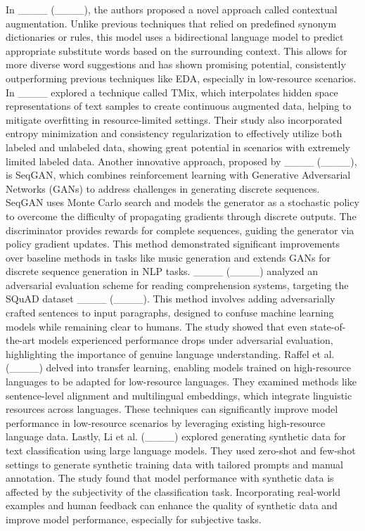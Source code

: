 In ____ (____), the authors proposed a novel approach called contextual augmentation. Unlike previous techniques that relied on predefined synonym dictionaries or rules, this model uses a bidirectional language model to predict appropriate substitute words based on the surrounding context. This allows for more diverse word suggestions and has shown promising potential, consistently outperforming previous techniques like EDA, especially in low-resource scenarios. In
____ explored a technique called TMix, which interpolates hidden space representations of text samples to create continuous augmented data, helping to mitigate overfitting in resource-limited settings. Their study also incorporated entropy minimization and consistency regularization to effectively utilize both labeled and unlabeled data, showing great potential in scenarios with extremely limited labeled data.
Another innovative approach, proposed by ____ (____), is SeqGAN, which combines reinforcement learning with Generative Adversarial Networks (GANs) to address challenges in generating discrete sequences. SeqGAN uses Monte Carlo search and models the generator as a stochastic policy to overcome the difficulty of propagating gradients through discrete outputs. The discriminator provides rewards for complete sequences, guiding the generator via policy gradient updates. This method demonstrated significant improvements over baseline methods in tasks like music generation and extends GANs for discrete sequence generation in NLP tasks. ____ (____) analyzed an adversarial evaluation scheme for reading comprehension systems, targeting the SQuAD dataset ____ (____). This method involves adding adversarially crafted sentences to input paragraphs, designed to confuse machine learning models while remaining clear to humans. The study showed that even state-of-the-art models experienced performance drops under adversarial evaluation, highlighting the importance of genuine language understanding.
Raffel et al. (____) delved into transfer learning, enabling models trained on high-resource languages to be adapted for low-resource languages. They examined methods like sentence-level alignment and multilingual embeddings, which integrate linguistic resources across languages. These techniques can significantly improve model performance in low-resource scenarios by leveraging existing high-resource language data.
Lastly, Li et al. (____) explored generating synthetic data for text classification using large language models. They used zero-shot and few-shot settings to generate synthetic training data with tailored prompts and manual annotation. The study found that model performance with synthetic data is affected by the subjectivity of the classification task. Incorporating real-world examples and human feedback can enhance the quality of synthetic data and improve model performance, especially for subjective tasks.

